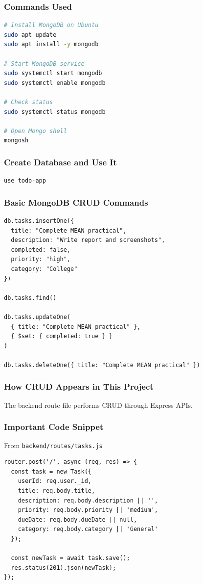 \documentclass[12pt,a4paper]{article}
\begin{document}
\subsubsection*{Commands Used}
\begin{lstlisting}[style=projectcode,language=bash]
# Install MongoDB on Ubuntu
sudo apt update
sudo apt install -y mongodb

# Start MongoDB service
sudo systemctl start mongodb
sudo systemctl enable mongodb

# Check status
sudo systemctl status mongodb

# Open Mongo shell
mongosh
\end{lstlisting}

\subsubsection*{Create Database and Use It}
\begin{lstlisting}[style=projectcode]
use todo-app
\end{lstlisting}

\subsubsection*{Basic MongoDB CRUD Commands}
\begin{lstlisting}[style=projectcode]
db.tasks.insertOne({
  title: "Complete MEAN practical",
  description: "Write report and screenshots",
  completed: false,
  priority: "high",
  category: "College"
})

db.tasks.find()

db.tasks.updateOne(
  { title: "Complete MEAN practical" },
  { $set: { completed: true } }
)

db.tasks.deleteOne({ title: "Complete MEAN practical" })
\end{lstlisting}

\subsubsection*{How CRUD Appears in This Project}
The backend route file performs CRUD through Express APIs.

\subsubsection*{Important Code Snippet}
From \texttt{backend/routes/tasks.js}
\begin{lstlisting}[style=projectcode]
router.post('/', async (req, res) => {
  const task = new Task({
    userId: req.user._id,
    title: req.body.title,
    description: req.body.description || '',
    priority: req.body.priority || 'medium',
    dueDate: req.body.dueDate || null,
    category: req.body.category || 'General'
  });

  const newTask = await task.save();
  res.status(201).json(newTask);
});
\end{lstlisting}
\end{document}
